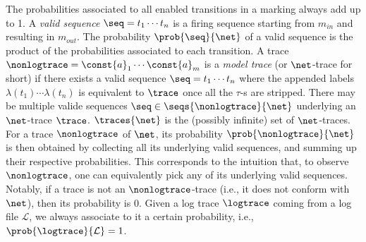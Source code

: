 %
The probabilities associated to all enabled transitions in a marking always add up to 1.
A \emph{valid sequence} $\seq = t_1\cdots t_n$ is a firing sequence starting from $m_{in}$ and resulting in $m_{out}$. The probability $\prob{\seq}{\net}$ of a valid sequence is the product of the probabilities associated to each transition. %
A trace $\nonlogtrace=\const{a}_1\cdots \const{a}_m$ is a \emph{model trace} (or $\net$-trace for short) if there exists a valid sequence $\seq = t_1\cdots t_n$ where the appended labels $\lambda(t_1)\cdots \lambda(t_n)$ is equivalent to $\trace$ once all the $\tau$-s are stripped.
There may be multiple valide sequences $\seq\in\seqs{\nonlogtrace}{\net}$ %
underlying an $\net$-trace $\trace$. 
$\traces{\net}$ is the (possibly infinite) set of $\net$-traces. For a trace $\nonlogtrace$ of $\net$, its probability $\prob{\nonlogtrace}{\net}$ is then obtained by collecting all its underlying valid sequences, %
and summing up their respective probabilities. %
This corresponds to the intuition that, to observe $\nonlogtrace$, one can equivalently pick any of its underlying valid sequences. Notably, if a trace is not an $\nonlogtrace$-trace (i.e., it does not conform with $\net$), then its probability is 0. Given a log trace $\logtrace$ coming from a log file $\mathcal{L}$, we always associate to it a certain probability, i.e., $\prob{\logtrace}{\mathcal{L}}=1$. 

